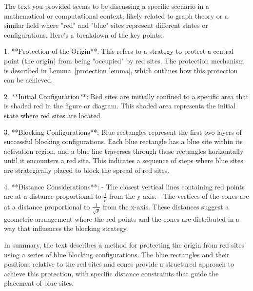 The text you provided seems to be discussing a specific scenario in a mathematical or computational context, likely related to graph theory or a similar field where "red" and "blue" sites represent different states or configurations. Here's a breakdown of the key points:

1. **Protection of the Origin**: This refers to a strategy to protect a central point (the origin) from being "occupied" by red sites. The protection mechanism is described in Lemma~\ref{protection lemma}, which outlines how this protection can be achieved.

2. **Initial Configuration**: Red sites are initially confined to a specific area that is shaded red in the figure or diagram. This shaded area represents the initial state where red sites are located.

3. **Blocking Configurations**: Blue rectangles represent the first two layers of successful blocking configurations. Each blue rectangle has a blue site within its activation region, and a blue line traverses through these rectangles horizontally until it encounters a red site. This indicates a sequence of steps where blue sites are strategically placed to block the spread of red sites.

4. **Distance Considerations**:
   - The closest vertical lines containing red points are at a distance proportional to \( \frac{1}{p} \) from the y-axis.
   - The vertices of the cones are at a distance proportional to \( \frac{1}{\sqrt{p}} \) from the x-axis. These distances suggest a geometric arrangement where the red points and the cones are distributed in a way that influences the blocking strategy.

In summary, the text describes a method for protecting the origin from red sites using a series of blue blocking configurations. The blue rectangles and their positions relative to the red sites and cones provide a structured approach to achieve this protection, with specific distance constraints that guide the placement of blue sites.